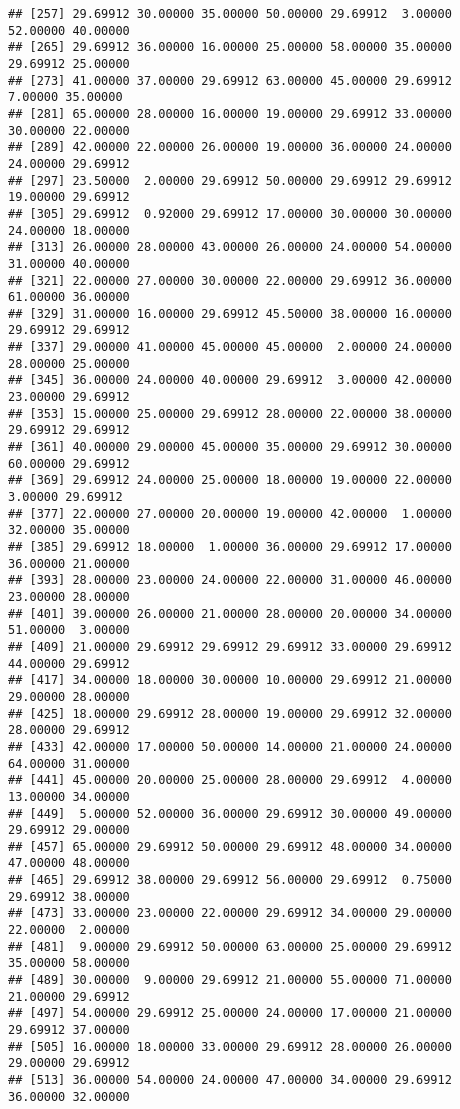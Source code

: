\documentclass[
]{article}
\begin{document}
\begin{verbatim}
## [257] 29.69912 30.00000 35.00000 50.00000 29.69912  3.00000 52.00000 40.00000
## [265] 29.69912 36.00000 16.00000 25.00000 58.00000 35.00000 29.69912 25.00000
## [273] 41.00000 37.00000 29.69912 63.00000 45.00000 29.69912  7.00000 35.00000
## [281] 65.00000 28.00000 16.00000 19.00000 29.69912 33.00000 30.00000 22.00000
## [289] 42.00000 22.00000 26.00000 19.00000 36.00000 24.00000 24.00000 29.69912
## [297] 23.50000  2.00000 29.69912 50.00000 29.69912 29.69912 19.00000 29.69912
## [305] 29.69912  0.92000 29.69912 17.00000 30.00000 30.00000 24.00000 18.00000
## [313] 26.00000 28.00000 43.00000 26.00000 24.00000 54.00000 31.00000 40.00000
## [321] 22.00000 27.00000 30.00000 22.00000 29.69912 36.00000 61.00000 36.00000
## [329] 31.00000 16.00000 29.69912 45.50000 38.00000 16.00000 29.69912 29.69912
## [337] 29.00000 41.00000 45.00000 45.00000  2.00000 24.00000 28.00000 25.00000
## [345] 36.00000 24.00000 40.00000 29.69912  3.00000 42.00000 23.00000 29.69912
## [353] 15.00000 25.00000 29.69912 28.00000 22.00000 38.00000 29.69912 29.69912
## [361] 40.00000 29.00000 45.00000 35.00000 29.69912 30.00000 60.00000 29.69912
## [369] 29.69912 24.00000 25.00000 18.00000 19.00000 22.00000  3.00000 29.69912
## [377] 22.00000 27.00000 20.00000 19.00000 42.00000  1.00000 32.00000 35.00000
## [385] 29.69912 18.00000  1.00000 36.00000 29.69912 17.00000 36.00000 21.00000
## [393] 28.00000 23.00000 24.00000 22.00000 31.00000 46.00000 23.00000 28.00000
## [401] 39.00000 26.00000 21.00000 28.00000 20.00000 34.00000 51.00000  3.00000
## [409] 21.00000 29.69912 29.69912 29.69912 33.00000 29.69912 44.00000 29.69912
## [417] 34.00000 18.00000 30.00000 10.00000 29.69912 21.00000 29.00000 28.00000
## [425] 18.00000 29.69912 28.00000 19.00000 29.69912 32.00000 28.00000 29.69912
## [433] 42.00000 17.00000 50.00000 14.00000 21.00000 24.00000 64.00000 31.00000
## [441] 45.00000 20.00000 25.00000 28.00000 29.69912  4.00000 13.00000 34.00000
## [449]  5.00000 52.00000 36.00000 29.69912 30.00000 49.00000 29.69912 29.00000
## [457] 65.00000 29.69912 50.00000 29.69912 48.00000 34.00000 47.00000 48.00000
## [465] 29.69912 38.00000 29.69912 56.00000 29.69912  0.75000 29.69912 38.00000
## [473] 33.00000 23.00000 22.00000 29.69912 34.00000 29.00000 22.00000  2.00000
## [481]  9.00000 29.69912 50.00000 63.00000 25.00000 29.69912 35.00000 58.00000
## [489] 30.00000  9.00000 29.69912 21.00000 55.00000 71.00000 21.00000 29.69912
## [497] 54.00000 29.69912 25.00000 24.00000 17.00000 21.00000 29.69912 37.00000
## [505] 16.00000 18.00000 33.00000 29.69912 28.00000 26.00000 29.00000 29.69912
## [513] 36.00000 54.00000 24.00000 47.00000 34.00000 29.69912 36.00000 32.00000

\end{verbatim}
\end{document}
